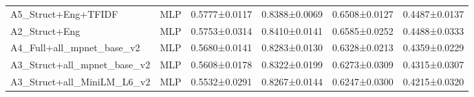 \begin{table}
\begin{tabular}{llcccc}
A5_Struct+Eng+TFIDF & MLP & 0.5777±0.0117 & 0.8388±0.0069 & 0.6508±0.0127 & 0.4487±0.0137 \\
A2_Struct+Eng & MLP & 0.5753±0.0314 & 0.8410±0.0141 & 0.6585±0.0252 & 0.4488±0.0333 \\
A4_Full+all_mpnet_base_v2 & MLP & 0.5680±0.0141 & 0.8283±0.0130 & 0.6328±0.0213 & 0.4359±0.0229 \\
A3_Struct+all_mpnet_base_v2 & MLP & 0.5608±0.0178 & 0.8322±0.0199 & 0.6273±0.0309 & 0.4315±0.0307 \\
A3_Struct+all_MiniLM_L6_v2 & MLP & 0.5532±0.0291 & 0.8267±0.0144 & 0.6247±0.0300 & 0.4215±0.0320 \\
\bottomrule
\end{tabular}
\end{table}
